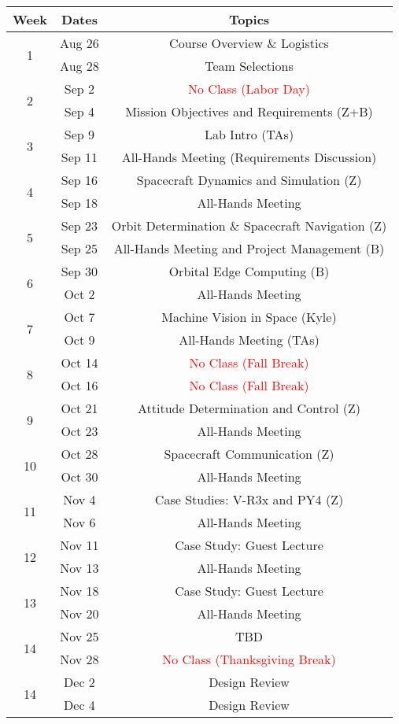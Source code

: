 \documentclass[11pt,letterpaper]{article}
\begin{document}
\begin{tabular}{c|c|c}
	Week & Dates & Topics \\
	\hline
	\multirow{2}{*}{1} & Aug 26 & Course Overview \& Logistics \\
	 & Aug 28 & Team Selections \\
	\hline
	\multirow{2}{*}{2} & Sep 2 & \textcolor{red}{No Class (Labor Day)} \\
	 & Sep 4 & Mission Objectives and Requirements (Z+B) \\
	\hline
	\multirow{2}{*}{3}  & Sep 9 & Lab Intro (TAs) \\
	 & Sep 11 & All-Hands Meeting (Requirements Discussion) \\
	\hline
	\multirow{2}{*}{4}  & Sep 16 & Spacecraft Dynamics and Simulation (Z)\\
	 & Sep 18 & All-Hands Meeting \\
	\hline
	\multirow{2}{*}{5}  & Sep 23 & Orbit Determination \& Spacecraft Navigation (Z) \\
	 & Sep 25 & All-Hands Meeting and Project Management (B)\\
	\hline
	\multirow{2}{*}{6}  & Sep 30 & Orbital Edge Computing (B) \\
	 & Oct 2 & All-Hands Meeting \\
	\hline
	\multirow{2}{*}{7}  & Oct 7 & Machine Vision in Space (Kyle) \\
	 & Oct 9 & All-Hands Meeting (TAs) \\
	\hline
	\multirow{2}{*}{8}  & Oct 14 & \textcolor{red}{No Class (Fall Break)} \\
	 & Oct 16 & \textcolor{red}{No Class (Fall Break)} \\
	\hline
	\multirow{2}{*}{9}  & Oct 21 & Attitude Determination and Control (Z) \\
	 & Oct 23 & All-Hands Meeting \\
	\hline
	\multirow{2}{*}{10}  & Oct 28 & Spacecraft Communication (Z) \\
	 & Oct 30 & All-Hands Meeting \\
	 \hline
	\multirow{2}{*}{11}  & Nov 4 &  Case Studies: V-R3x and PY4 (Z) \\
	 & Nov 6 & All-Hands Meeting \\
	 \hline
	\multirow{2}{*}{12}  & Nov 11 & Case Study: Guest Lecture \\
	 & Nov 13 & All-Hands Meeting \\
	 \hline
	\multirow{2}{*}{13}  & Nov 18 & Case Study: Guest Lecture \\
	 & Nov 20 & All-Hands Meeting \\
	 \hline
	\multirow{2}{*}{14}  & Nov 25 & TBD \\
	 & Nov 28 & \textcolor{red}{No Class (Thanksgiving Break)} \\
	 \hline
	\multirow{2}{*}{14}  & Dec 2 & Design Review \\
	 & Dec 4 & Design Review \\
\end{tabular}
\end{document}

